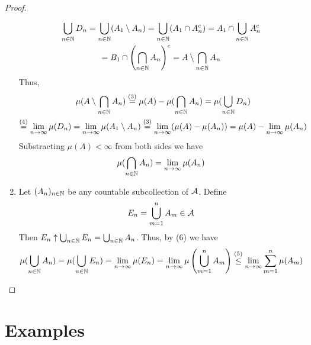 \begin{proof}
\begin{enumerate}
		\begin{multline*}
		\bigcup_{n\in\mathbb{N}} D_n = \bigcup_{n \in \mathbb{N}} (A_1\setminus A_n) = \bigcup_{n \in \mathbb{N}} (A_1\cap A_n^c) = A_1 \cap \bigcup_{n \in \mathbb{N}} A_n^c \\
		= B_1 \cap \left(\bigcap_{n \in \mathbb{N}} A_n\right)^c = A \setminus \bigcap_{n\in\mathbb{N}} A_n
		\end{multline*}
		Thus,
		\begin{multline*}
		\mu(A \setminus \bigcap_{n\in\mathbb{N}} A_n) \overset{(3)}{=} \mu(A) - \mu(\bigcap_{n\in\mathbb{N}} A_n) = \mu(\bigcup_{n \in \mathbb{N}} D_n) \\
		\overset{(4)}{=} \lim_{n\to \infty}\mu(D_n) = \lim_{n\to \infty} \mu(A_1 \setminus A_n) \overset{(3)}{=} \lim_{n\to \infty} (\mu(A) - \mu(A_n)) = \mu(A) - \lim_{n\to \infty} \mu(A_n)
		\end{multline*}
		Substracting $\mu(A) <\infty$ from both sides we have
		\begin{align*}
		\mu(\bigcap_{n \in \mathbb{N}} A_n) = \lim_{n\to \infty} \mu(A_n)
		\end{align*}
		\item Let $(A_n)_{n\in\mathbb{N}}$ be any countable subcollection of $\mathcal{A}$. Define
		\begin{align*}
		E_n = \bigcup_{m = 1}^n A_m \in \mathcal{A}
		\end{align*}
		Then $E_n \uparrow \bigcup_{n\in\mathbb{N}} E_n = \bigcup_{n\in\mathbb{N}} A_n$. Thus, by (6) we have
		\begin{align*}
		\mu(\bigcup_{n\in\mathbb{N}} A_n) = \mu(\bigcup_{n\in\mathbb{N}} E_n) = \lim_{n\to \infty} \mu(E_n) = \lim_{n\to \infty} \mu\left(\bigcup_{m = 1}^n A_m\right) \overset{(5)}{\leq}\lim_{n\to \infty} \sum_{m=1}^{n}\mu(A_m)
		\end{align*}
	\end{enumerate}
\end{proof}


\section{Examples}

